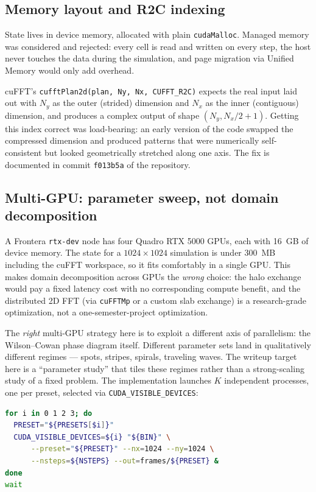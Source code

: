 \documentclass[11pt]{article}
\begin{document}
\subsection{Memory layout and R2C indexing}

State lives in device memory, allocated with plain \texttt{cudaMalloc}.
Managed memory was considered and rejected: every cell is read and
written on every step, the host never touches the data during the
simulation, and page migration via Unified Memory would only add
overhead.

cuFFT's \texttt{cufftPlan2d(plan, Ny, Nx, CUFFT\_R2C)} expects the
real input laid out with $N_{y}$ as the outer (strided) dimension and
$N_{x}$ as the inner (contiguous) dimension, and produces a complex
output of shape $(N_{y}, N_{x}/2 + 1)$. Getting this index correct
was load-bearing: an early version of the code swapped the
compressed dimension and produced patterns that were numerically
self-consistent but looked geometrically stretched along one axis.
The fix is documented in commit \texttt{f013b5a} of the repository.

\subsection{Multi-GPU: parameter sweep, not domain decomposition}

A Frontera \texttt{rtx-dev} node has four Quadro RTX 5000 GPUs, each
with \SI{16}{GB} of device memory. The state for a
$1024 \times 1024$ simulation is under \SI{300}{MB} including the
cuFFT workspace, so it fits comfortably in a single GPU. This makes
domain decomposition across GPUs the \emph{wrong} choice: the halo
exchange would pay a fixed latency cost with no corresponding compute
benefit, and the distributed 2D FFT (via \texttt{cuFFTMp} or a custom
slab exchange) is a research-grade optimization, not a
one-semester-project optimization.

The \emph{right} multi-GPU strategy here is to exploit a different
axis of parallelism: the Wilson--Cowan phase diagram itself. Different
parameter sets land in qualitatively different regimes --- spots,
stripes, spirals, traveling waves. The writeup target here is a
``parameter study'' that tiles these regimes rather than a
strong-scaling study of a fixed problem. The implementation launches
$K$ independent processes, one per preset, selected via
\texttt{CUDA\_VISIBLE\_DEVICES}:

\begin{lstlisting}[language=bash,caption={Excerpt from
  \texttt{scripts/job\_sweep.sh}: four independent runs, one per GPU,
  stitched by \texttt{wait}.}]
for i in 0 1 2 3; do
  PRESET="${PRESETS[$i]}"
  CUDA_VISIBLE_DEVICES=${i} "${BIN}" \
      --preset="${PRESET}" --nx=1024 --ny=1024 \
      --nsteps=${NSTEPS} --out=frames/${PRESET} &
done
wait
\end{lstlisting}
\end{document}

